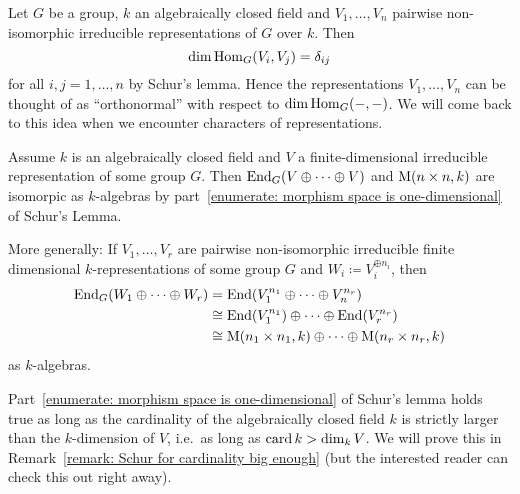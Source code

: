 \begin{remark}
  Let $G$ be a group, $k$ an algebraically closed field and $V_1, \dotsc, V_n$ pairwise non-isomorphic irreducible representations of $G$ over $k$.
  Then
  \[
      \dim \operatorname{Hom}_G(V_i, V_j)
    = \delta_{ij}
  \]
  for all $i,j = 1, \dotsc, n$ by Schur’s lemma.
  Hence the representations $V_1, \dotsc, V_n$ can be thought of as “orthonormal” with respect to $\dim \operatorname{Hom}_G(-,-)$.
  We will come back to this idea when we encounter characters of representations.
\end{remark}


\begin{remark}
  Assume $k$ is an algebraically closed field and $V$ a finite-dimensional irreducible representation of some group $G$.
  Then $\operatorname{End}_G(V \oplus \dotsb \oplus V)$ and $\operatorname{M}(n \times n, k)$ are isomorpic as $k$-algebras by part~\ref{enumerate: morphism space is one-dimensional} of Schur’s Lemma.
  
  More generally:
  If $V_1, \dotsc, V_r$ are pairwise non-isomorphic irreducible finite dimensional $k$-representations of some group $G$ and $W_i \coloneqq V_i^{\oplus n_i}$, then
  \begin{align*}
            \operatorname{End}_G(W_1 \oplus \dotsb \oplus W_r)
    &=      \operatorname{End}(V_1^{n_1} \oplus \dotsb \oplus V_n^{n_r})
    \\
    &\cong  \operatorname{End}(V_1^{n_1}) \oplus \dotsb \oplus \operatorname{End}(V_r^{n_r})
    \\
    &\cong  \operatorname{M}(n_1 \times n_1, k) \oplus \dotsb \oplus \operatorname{M}(n_r \times n_r, k)
  \end{align*}
  as $k$-algebras.
\end{remark}


\begin{remark}
  Part~\ref{enumerate: morphism space is one-dimensional} of Schur’s lemma holds true as long as the cardinality of the algebraically closed field $k$ is strictly larger than the $k$-dimension of $V$, i.e.\ as long as $\operatorname{card} k > \dim_k V$.
  We will prove this in Remark~\ref{remark: Schur for cardinality big enough} (but the interested reader can check this out right away).
\end{remark}
